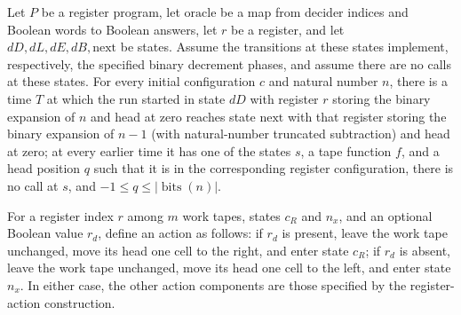 \begin{lemma}
\label{Complexity.LogProg.dec_run}
\leanok
{}
Let $P$ be a register program, let $\mathrm{oracle}$ be a map from decider indices and
Boolean words to Boolean answers, let $r$ be a register, and let
$dD,dL,dE,dB,\mathrm{next}$ be states. Assume the transitions at these states implement,
respectively, the specified binary decrement phases, and assume there are no calls at
these states. For every initial configuration $c$ and natural number $n$, there is a
time $T$ at which the run started in state $dD$ with register $r$ storing the binary
expansion of $n$ and head at zero reaches state $\mathrm{next}$ with that register
storing the binary expansion of $n-1$ (with natural-number truncated subtraction) and
head at zero; at every earlier time it has one of the states $s$, a tape function $f$,
and a head position $q$ such that it is in the corresponding register configuration,
there is no call at $s$, and $-1\le q\le |\operatorname{bits}(n)|$.
\end{lemma}

\begin{definition}
\label{Complexity.LogProg.toEndAct}
\leanok
{}
For a register index $r$ among $m$ work tapes, states $c_R$ and $n_x$, and an optional
Boolean value $r_d$, define an action as follows: if $r_d$ is present, leave the work
tape unchanged, move its head one cell to the right, and enter state $c_R$; if $r_d$ is
absent, leave the work tape unchanged, move its head one cell to the left, and enter
state $n_x$. In either case, the other action components are those specified by the
register-action construction.
\end{definition}

